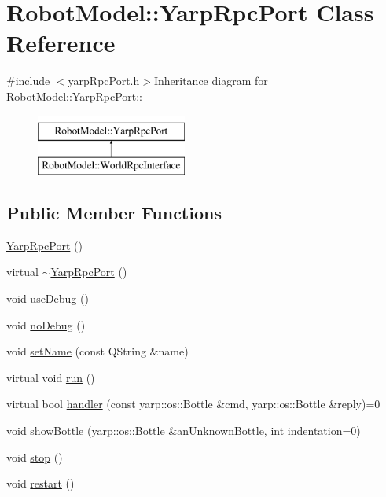 \hypertarget{class_robot_model_1_1_yarp_rpc_port}{
\section{RobotModel::YarpRpcPort Class Reference}
\label{class_robot_model_1_1_yarp_rpc_port}
}


{\ttfamily \#include $<$yarpRpcPort.h$>$}Inheritance diagram for RobotModel::YarpRpcPort::\begin{figure}[H]
\begin{center}
\leavevmode
\includegraphics[height=2cm]{class_robot_model_1_1_yarp_rpc_port}
\end{center}
\end{figure}
\subsection*{Public Member Functions}
\begin{DoxyCompactItemize}
\item 
\hyperlink{class_robot_model_1_1_yarp_rpc_port_a393b44f37d77b25d8c5cb7f14609c4d5}{YarpRpcPort} ()
\item 
virtual \hyperlink{class_robot_model_1_1_yarp_rpc_port_acf21bbb8e38b69fd9c3769a2f9b45743}{$\sim$YarpRpcPort} ()
\item 
void \hyperlink{class_robot_model_1_1_yarp_rpc_port_a6fe22d6e8403cb3560964dd31d66c243}{useDebug} ()
\item 
void \hyperlink{class_robot_model_1_1_yarp_rpc_port_a87e299eb43783a25cd71def0e50eb9dc}{noDebug} ()
\item 
void \hyperlink{class_robot_model_1_1_yarp_rpc_port_aa30cabbf5681b128766ad8556c33cd65}{setName} (const QString \&name)
\item 
virtual void \hyperlink{class_robot_model_1_1_yarp_rpc_port_a3e4c1be7ae685d9478b38d71255b1bcd}{run} ()
\item 
virtual bool \hyperlink{class_robot_model_1_1_yarp_rpc_port_a156879aeb8b6641c0f63a6633af8c568}{handler} (const yarp::os::Bottle \&cmd, yarp::os::Bottle \&reply)=0
\item 
void \hyperlink{class_robot_model_1_1_yarp_rpc_port_ae26626cb99ca15bfec5e5162845018c2}{showBottle} (yarp::os::Bottle \&anUnknownBottle, int indentation=0)
\item 
void \hyperlink{class_robot_model_1_1_yarp_rpc_port_a1554e6c2e38cb71f2521280f65bbab05}{stop} ()
\item 
void \hyperlink{class_robot_model_1_1_yarp_rpc_port_a93d242e15bb04534f7db4fe6636a0086}{restart} ()
\end{DoxyCompactItemize}


